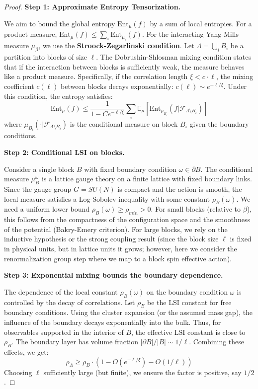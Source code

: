 \begin{proof}
\textbf{Step 1: Approximate Entropy Tensorization.}

We aim to bound the global entropy $\mathrm{Ent}_{\mu}(f)$ by a sum of local entropies.
For a product measure, $\mathrm{Ent}_{\mu}(f) \leq \sum_i \mathrm{Ent}_{\mu_i}(f)$.
For the interacting Yang-Mills measure $\mu_\beta$, we use the \textbf{Stroock-Zegarlinski condition}.
Let $\Lambda = \bigcup_i B_i$ be a partition into blocks of size $\ell$.
The Dobrushin-Shlosman mixing condition states that if the interaction between blocks is sufficiently weak, the measure behaves like a product measure.
Specifically, if the correlation length $\xi < c \cdot \ell$, the mixing coefficient $c(\ell)$ between blocks decays exponentially: $c(\ell) \sim e^{-\ell/\xi}$.
Under this condition, the entropy satisfies:
\begin{equation}
\mathrm{Ent}_{\mu}(f) \leq \frac{1}{1 - C e^{-\ell/\xi}} \sum_i \mathbb{E}_\mu [\mathrm{Ent}_{\mu_{B_i}}(f | \mathcal{F}_{\Lambda \setminus B_i})]
\end{equation}
where $\mu_{B_i}(\cdot | \mathcal{F}_{\Lambda \setminus B_i})$ is the conditional measure on block $B_i$ given the boundary conditions.

\textbf{Step 2: Conditional LSI on blocks.}

Consider a single block $B$ with fixed boundary condition $\omega \in \partial B$.
The conditional measure $\mu_B^\omega$ is a lattice gauge theory on a finite lattice with fixed boundary links.
Since the gauge group $G=SU(N)$ is compact and the action is smooth, the local measure satisfies a Log-Sobolev inequality with some constant $\rho_B(\omega)$.
We need a uniform lower bound $\rho_B(\omega) \geq \rho_{min} > 0$.
For small blocks (relative to $\beta$), this follows from the compactness of the configuration space and the smoothness of the potential (Bakry-Emery criterion).
For large blocks, we rely on the inductive hypothesis or the strong coupling result (since the block size $\ell$ is fixed in physical units, but in lattice units it grows; however, here we consider the renormalization group step where we map to a block spin effective action).

\textbf{Step 3: Exponential mixing bounds the boundary dependence.}

The dependence of the local constant $\rho_B(\omega)$ on the boundary condition $\omega$ is controlled by the decay of correlations.
Let $\rho_B$ be the LSI constant for free boundary conditions.
Using the cluster expansion (or the assumed mass gap), the influence of the boundary decays exponentially into the bulk.
Thus, for observables supported in the interior of $B$, the effective LSI constant is close to $\rho_B$.
The boundary layer has volume fraction $|\partial B|/|B| \sim 1/\ell$.
Combining these effects, we get:
\begin{equation}
\rho_\Lambda \geq \rho_B \cdot (1 - O(e^{-\ell/\xi}) - O(1/\ell))
\end{equation}
Choosing $\ell$ sufficiently large (but finite), we ensure the factor is positive, say $1/2$.


\end{proof}
